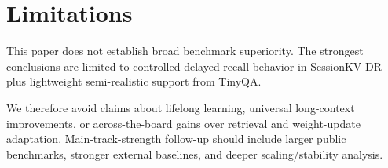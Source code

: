 \section{Limitations}
This paper does not establish broad benchmark superiority. The strongest conclusions are limited to controlled delayed-recall behavior in SessionKV-DR plus lightweight semi-realistic support from TinyQA.

We therefore avoid claims about lifelong learning, universal long-context improvements, or across-the-board gains over retrieval and weight-update adaptation. Main-track-strength follow-up should include larger public benchmarks, stronger external baselines, and deeper scaling/stability analysis.
